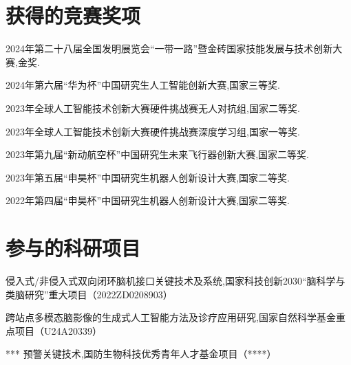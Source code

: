 \begin{resume}
          \section*{获得的竞赛奖项} %

        \begin{enumerate}[label={[\arabic*]},labelsep=6pt,topsep=0pt,partopsep=0pt,
        parsep=0pt,itemsep=1pt,leftmargin=0em,itemindent=42pt]
        \normalsize
        \item 2024年第二十八届全国发明展览会“一带一路”暨金砖国家技能发展与技术创新大赛,金奖.
        \item 2024年第六届“华为杯”中国研究生人工智能创新大赛,国家三等奖.
        \item 2023年全球人工智能技术创新大赛硬件挑战赛无人对抗组,国家二等奖.
        \item 2023年全球人工智能技术创新大赛硬件挑战赛深度学习组,国家一等奖.
        \item 2023年第九届“新动航空杯”中国研究生未来飞行器创新大赛,国家二等奖.
        \item 2023年第五届“申昊杯”中国研究生机器人创新设计大赛,国家二等奖.
        \item 2022年第四届“申昊杯”中国研究生机器人创新设计大赛,国家二等奖.
        \end{enumerate}

        \section*{参与的科研项目} %

          \begin{enumerate}[label={[\arabic*]},labelsep=6pt,topsep=0pt,partopsep=0pt,
          parsep=0pt,itemsep=1pt,leftmargin=0em,itemindent=42pt]
          \normalsize
          \item 侵入式/非侵入式双向闭环脑机接口关键技术及系统,国家科技创新2030“脑科学与类脑研究”重大项目（2022ZD0208903）
          \item 跨站点多模态脑影像的生成式人工智能方法及诊疗应用研究,国家自然科学基金重点项目（U24A20339）
          \item **** 预警关键技术,国防生物科技优秀青年人才基金项目（****）
          \end{enumerate}

        \fi
    \fi
\else\relax
\fi

\ifisanon\relax
\else
\ifisresumebib


\end{resume}
